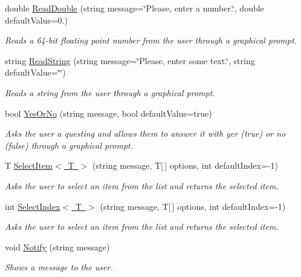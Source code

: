 \begin{DoxyCompactItemize}
double \mbox{\hyperlink{class_s_g_l_1_1_graph_ab84327403a05e999998f54b1bc4d1c35}{Read\+Double}} (string message=\char`\"{}Please, enter a number.\char`\"{}, double default\+Value=0.)
\begin{DoxyCompactList}\small\item\em Reads a 64-\/bit floating point number from the user through a graphical prompt. \end{DoxyCompactList}\item 
string \mbox{\hyperlink{class_s_g_l_1_1_graph_a25db2a007fb5adaa390a44f16d4d653e}{Read\+String}} (string message=\char`\"{}Please, enter some text.\char`\"{}, string default\+Value=\char`\"{}\char`\"{})
\begin{DoxyCompactList}\small\item\em Reads a string from the user through a graphical prompt. \end{DoxyCompactList}\item 
bool \mbox{\hyperlink{class_s_g_l_1_1_graph_add2e8a9bb0b5174fc9a80e21b7d407e8}{Yes\+Or\+No}} (string message, bool default\+Value=true)
\begin{DoxyCompactList}\small\item\em Asks the user a questing and allows them to answer it with yer (true) or no (false) through a graphical prompt. \end{DoxyCompactList}\item 
T \mbox{\hyperlink{class_s_g_l_1_1_graph_a482da34c25dc49ec1fe1aed288d2807a}{Select\+Item$<$ T $>$}} (string message, T\mbox{[}$\,$\mbox{]} options, int default\+Index=-\/1)
\begin{DoxyCompactList}\small\item\em Asks the user to select an item from the list and returns the selected item. \end{DoxyCompactList}\item 
int \mbox{\hyperlink{class_s_g_l_1_1_graph_ab1d2be74da25ee0a40829993a2f597c4}{Select\+Index$<$ T $>$}} (string message, T\mbox{[}$\,$\mbox{]} options, int default\+Index=-\/1)
\begin{DoxyCompactList}\small\item\em Asks the user to select an item from the list and returns the selected item. \end{DoxyCompactList}\item 
void \mbox{\hyperlink{class_s_g_l_1_1_graph_a16bfdc1d809835f73bd9870af125b161}{Notify}} (string message)
\begin{DoxyCompactList}\small\item\em Shows a message to the user. \end{DoxyCompactList}\item 

\end{DoxyCompactItemize}
